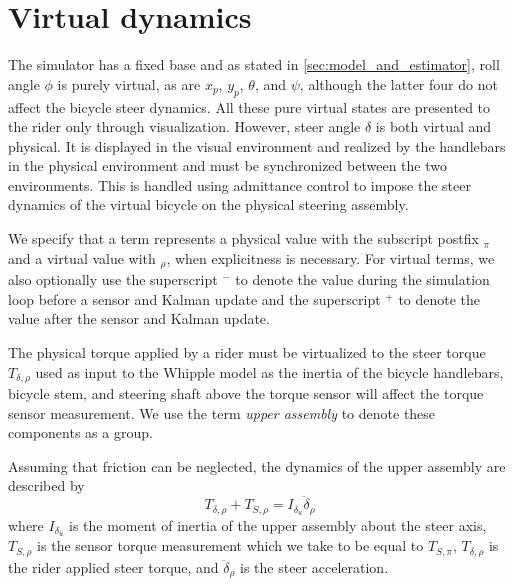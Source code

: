 \documentclass{icsc}
\newcommand{\x}{x_{p}}
\newcommand{\y}{y_{p}}
\newcommand{\pitch}{\theta}
\newcommand{\yaw}{\psi}
\newcommand{\roll}{\phi}
\newcommand{\steer}{\delta}
\newcommand{\steerAccel}{\ddot{\delta}}
\newcommand{\pre}{-}
\newcommand{\post}{+}
\newcommand{\virtual}{\rho}
\newcommand{\physical}{\pi}
\begin{document}
\section{Virtual dynamics}
The simulator has a fixed base and as stated in \autoref{sec:model_and_estimator}, roll angle $\roll$ is purely
virtual, as are $\x$, $\y$, $\pitch$, and $\yaw$, although the latter four do not affect the bicycle steer dynamics.
All these pure virtual states are presented to the rider only through visualization.
However, steer angle $\delta$ is both virtual and physical.
It is displayed in the visual environment and realized by the handlebars in the physical environment and must be
synchronized between the two environments.
This is handled using admittance control to impose the steer dynamics of the virtual bicycle on the physical steering
assembly.

We specify that a term represents a physical value with the subscript postfix $_\physical$ and a virtual value
with $_\virtual$, when explicitness is necessary.
For virtual terms, we also optionally use the superscript $^\pre$ to denote the value during the simulation loop
before a sensor and Kalman update and the superscript $^\post$ to denote the value after the sensor and Kalman
update.

The physical torque applied by a rider must be virtualized to the steer torque $T_{\steer,\virtual}$ used as input
to the Whipple model as the inertia of the bicycle handlebars, bicycle stem, and steering shaft above the torque
sensor will affect the torque sensor measurement.
We use the term \textit{upper assembly} to denote these components as a group.

Assuming that friction can be neglected, the dynamics of the upper assembly are described by
\begin{equation}
    T_{\steer,\virtual} + T_{S,\virtual} = I_{\steer_u} \steerAccel_\virtual \label{eq:eom_upper_assem}
\end{equation}
where $ I_{\steer_u}$ is the moment of inertia of the upper assembly about the steer axis,
$T_{S,\virtual}$ is the sensor torque measurement which we take to be equal to $T_{S,\physical}$,
$T_{\steer,\virtual}$ is the rider applied steer torque,
and $\steerAccel_\virtual$ is the steer acceleration.
\end{document}
